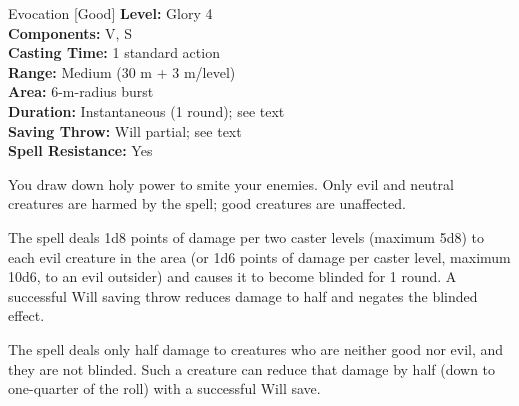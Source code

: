 {Evocation [Good]}
{
	\textbf{Level:}
	Glory 4\\
	\textbf{Components:}
	V, S\\
	\textbf{Casting Time:}
	1 standard action\\
	\textbf{Range:}
	Medium (30 m + 3 m/level)\\
	\textbf{Area:}
	6-m-radius burst\\
	\textbf{Duration:}
	Instantaneous (1 round); see text\\
	\textbf{Saving Throw:}
	Will partial; see text\\
	\textbf{Spell Resistance:}
	Yes\\
}
{
	You draw down holy power to smite your enemies. Only evil and neutral creatures are harmed by the spell; good creatures are unaffected.

	The spell deals 1d8 points of damage per two caster levels (maximum 5d8) to each evil creature in the area (or 1d6 points of damage per caster level, maximum 10d6, to an evil outsider) and causes it to become blinded for 1 round. A successful Will saving throw reduces damage to half and negates the blinded effect.

	The spell deals only half damage to creatures who are neither good nor evil, and they are not blinded. Such a creature can reduce that damage by half (down to one-quarter of the roll) with a successful Will save.

}
